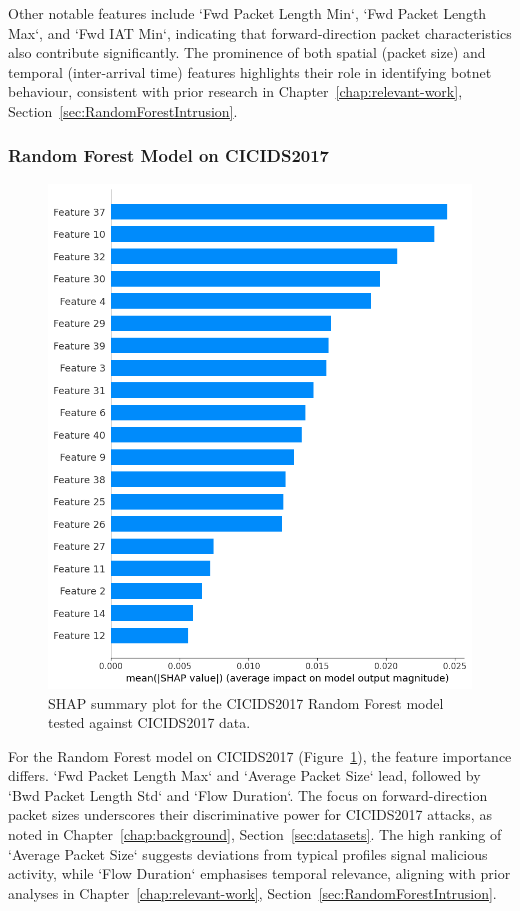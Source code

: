 Other notable features include `Fwd Packet Length Min`, `Fwd Packet Length Max`, and `Fwd IAT Min`, indicating that forward-direction packet characteristics also contribute significantly. The prominence of both spatial (packet size) and temporal (inter-arrival time) features highlights their role in identifying botnet behaviour, consistent with prior research in Chapter~\ref{chap:relevant-work}, Section~\ref{sec:RandomForestIntrusion}.

\subsubsection{Random Forest Model on CICIDS2017}\label{subsec:rf-cicids2017}

\begin{figure}[H]
\centering
\includegraphics[width=\textwidth]{img/SHAP_RFCICIDS2017_CICIDS2017.png}
\caption{SHAP summary plot for the CICIDS2017 Random Forest model tested against CICIDS2017 data.}\label{fig:shap_rfc_cicids2017_cicids2017}
\end{figure}

For the Random Forest model on CICIDS2017 (Figure~\ref{fig:shap_rfc_cicids2017_cicids2017}), the feature importance differs. `Fwd Packet Length Max` and `Average Packet Size` lead, followed by `Bwd Packet Length Std` and `Flow Duration`. The focus on forward-direction packet sizes underscores their discriminative power for CICIDS2017 attacks, as noted in Chapter~\ref{chap:background}, Section~\ref{sec:datasets}. The high ranking of `Average Packet Size` suggests deviations from typical profiles signal malicious activity, while `Flow Duration` emphasises temporal relevance, aligning with prior analyses in Chapter~\ref{chap:relevant-work}, Section~\ref{sec:RandomForestIntrusion}.

